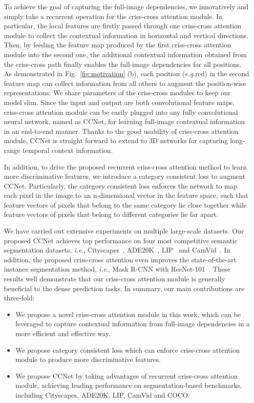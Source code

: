 \documentclass[10pt,journal,compsoc]{IEEEtran}
\def\eg{\emph{e.g}.} \def\Eg{\emph{E.g}.}
\def\ie{\emph{i.e}.} \def\Ie{\emph{I.e}.}
\begin{document}
To achieve the goal of capturing the full-image dependencies, we innovatively and simply take a recurrent operation for the criss-cross attention module. In particular, the local features are firstly passed through one criss-cross attention module to collect the contextual information in horizontal and vertical directions. Then, by feeding the feature map produced by the first criss-cross attention module into the second one, the additional contextual information obtained from the criss-cross path finally enables the full-image dependencies for all positions. As demonstrated in Fig.~\ref{fig:motivation} (b), each position (\eg red) in the second feature map can collect information from all others to augment the position-wise representations. We share parameters of the criss-cross modules to keep our model slim. Since the input and output are both convolutional feature maps, criss-cross attention module can be easily plugged into any fully convolutional neural network, named as CCNet, for learning  full-image contextual information in an end-to-end manner. Thanks to the good usability of criss-cross attention module, CCNet is straight forward to extend to 3D networks for capturing long-range temporal context information. 

In addition, to drive the proposed recurrent criss-cross attention method to learn more discriminative features, we introduce a category consistent loss to augment CCNet. Particularly, the category consistent loss enforces the network to map each pixel in the image to an n-dimensional vector in the feature space, such that feature vectors of pixels that belong to the same category lie close together while feature vectors of pixels that belong to different categories lie far apart.

We have carried out extensive experiments on multiple large-scale datasets. Our proposed CCNet achieves top performance on four most competitive semantic segmentation datasets, \ie, Cityscapes~\cite{cordts2016cityscapes}, ADE20K~\cite{zhou2017scene}, LIP~\cite{liang2018look} and CamVid~\cite{brostow2009semantic}. In addition, the proposed criss-cross attention even improves the state-of-the-art instance segmentation method, \ie, Mask R-CNN with ResNet-101~\cite{he2016deep}. These results well demonstrate that our criss-cross attention module is generally beneficial to the dense prediction tasks. In summary, our main contributions are three-fold:
\begin{itemize}
     \item We propose a novel criss-cross attention module in this work, which can be leveraged to capture contextual information from full-image dependencies in a more efficient and effective way.
     \item We propose category consistent loss which can enforce  criss-cross attention module to produce more discriminative features.
     \item We propose CCNet by taking advantages of recurrent criss-cross attention module, achieving leading performance on segmentation-based benchmarks, including Cityscapes, ADE20K, LIP, CamVid and COCO.
\end{itemize}
\end{document}
